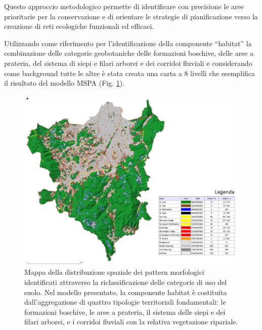 \documentclass[
  a4paper,
]{book}
\begin{document}
Questo approccio metodologico permette di identificare con precisione le aree prioritarie per la conservazione e di orientare le strategie di pianificazione verso la creazione di reti ecologiche funzionali ed efficaci.

Utilizzando come riferimento per l'identificazione della componente ``habitat'' la combinazione delle categorie geobotaniche delle formazioni boschive, delle aree a prateria, del sistema di siepi e filari arborei e dei corridoi fluviali e considerando come background tutte le altre è stata creata una carta a 8 livelli che esemplifica il risultato del modello MSPA (Fig. \ref{fig:mspaAll}).

\begin{figure}

{\centering \includegraphics[width=\linewidth]{./figs/mspa8211_relazione} 

}

\caption{Mappa della distribuzione spaziale dei pattern morfologici identificati attraverso la riclassificazione delle categorie di uso del suolo. Nel modello presentato, la componente habitat è  costituita dall'aggregazione di quattro tipologie territoriali fondamentali: le formazioni boschive, le aree a prateria, il sistema delle siepi e dei filari arborei, e i corridoi fluviali con la relativa vegetazione ripariale.}\label{fig:mspaAll}
\end{figure}
\end{document}
